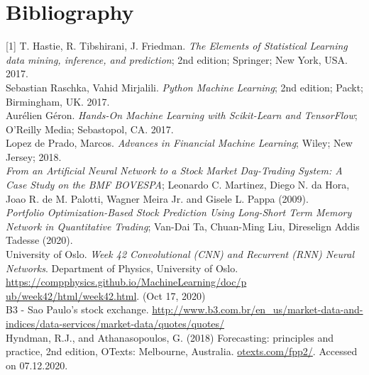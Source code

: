 \section{Bibliography}
\label{chap:Bibliography}

\label{Bib:T. Hastie, R. Tibshirani, J. Friedman}[1] T. Hastie, R. Tibshirani, J. Friedman. \textit{The Elements of Statistical Learning data mining, inference, and prediction}; 2nd edition; Springer; New York, USA. 2017.\\

\label{Bib:Sebastian Raschka, Vahid Mirjalili}\noindent [2] Sebastian Raschka, Vahid Mirjalili. \textit{Python Machine Learning}; 2nd edition; Packt; Birmingham, UK. 2017.\\

\label{Bib:Aurelien Geron}\noindent [3] Aurélien Géron. \textit{Hands-On Machine Learning with Scikit-Learn and TensorFlow}; O'Reilly Media; Sebastopol, CA. 2017.\\

\label{Bib:Lopez de Prado}\noindent [4] Lopez de Prado, Marcos. \textit{Advances in Financial Machine Learning}; Wiley; New Jersey; 2018.\\

\label{Bib:Leonardo C. Martinez, Diego N. da Hora, Joao R. de M. Palotti, Wagner Meira Jr. and Gisele L. Pappa}\noindent [5] \textit{From an Artificial Neural Network to a Stock Market Day-Trading System: A Case Study on the BMF BOVESPA}; Leonardo C. Martinez, Diego N. da Hora, Joao R. de M. Palotti, Wagner Meira Jr. and Gisele L. Pappa (2009).\\

\label{Bib:Van-Dai Ta, Chuan-Ming Liu, Direselign Addis Tadesse}\noindent [6] \textit{Portfolio Optimization-Based Stock Prediction Using
Long-Short Term Memory Network in Quantitative
Trading}; Van-Dai Ta, Chuan-Ming Liu, Direselign Addis Tadesse (2020).\\

\label{Bib:Week42Notes}\noindent [7] University of Oslo. \textit{Week 42 Convolutional (CNN) and Recurrent (RNN) Neural Networks}. Department of Physics, University of Oslo. \href{https://compphysics.github.io/MachineLearning/doc/pub/week42/html/week42.html}{https://compphysics.github.io/MachineLearning/doc/p}
\href{https://compphysics.github.io/MachineLearning/doc/pub/week41/html/week41.html}{ub/week42/html/week42.html}. (Oct 17, 2020)\\

\label{Bib:b3 quotes}\noindent [8] B3 - Sao Paulo's stock exchange. \href{http://www.b3.com.br/en_us/market-data-and-indices/data-services/market-data/quotes/quotes/}{http://www.b3.com.br/en\_us/market-data-and-indices/data-services/market-data/quotes/quotes/}\\

\label{Bib:Hyndman, R.J., and Athanasopoulos, G.}\noindent [9] Hyndman, R.J., and Athanasopoulos, G. (2018) Forecasting: principles and practice, 2nd edition, OTexts: Melbourne, Australia. \href{https://otexts.com/fpp2/}{otexts.com/fpp2/}. Accessed on 07.12.2020.
